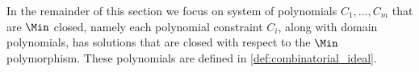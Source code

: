 \documentclass[11pt]{article}
\newtheorem{theorem}{Theorem}[section]
\newtheorem{corollary}[theorem]{Corollary}
\begin{document}
% 


In the remainder of this section we focus on system of polynomials $C_1,\ldots, C_m$ that are $\Min$ closed, namely each polynomial constraint $C_i$, along with domain polynomials, has solutions that are closed with respect to the $\Min$ polymorphism. These polynomials are defined in \cref{def:combinatorial_ideal}.
\end{document}
